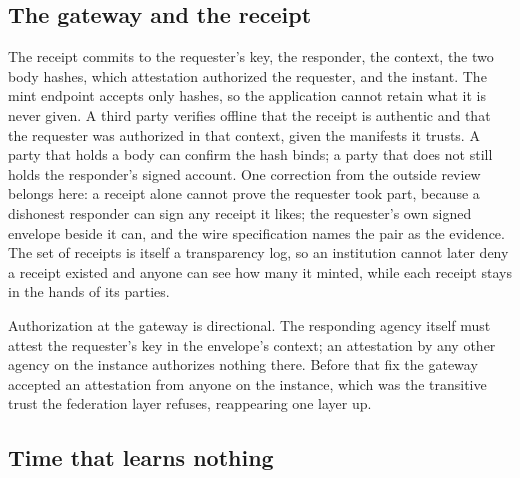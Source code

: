 \subsection{The gateway and the receipt}

The receipt commits to the requester's key, the responder, the context, the two body hashes, which
attestation authorized the requester, and the instant. The mint endpoint accepts only hashes, so the
application cannot retain what it is never given. A third party verifies offline that the receipt is
authentic and that the requester was authorized in that context, given the manifests it trusts. A
party that holds a body can confirm the hash binds; a party that does not still holds the
responder's signed account. One correction from the outside review belongs here: a receipt alone
cannot prove the requester took part, because a dishonest responder can sign any receipt it likes;
the requester's own signed envelope beside it can, and the wire specification names the pair as the
evidence. The set of receipts is itself a transparency log, so an institution cannot later deny a
receipt existed and anyone can see how many it minted, while each receipt stays in the hands of its
parties. \sImpl


Authorization at the gateway is directional. The responding agency itself must
attest the requester's key in the envelope's context; an attestation by any other agency on the
instance authorizes nothing there. Before that fix the gateway accepted an attestation from anyone
on the instance, which was the transitive trust the federation layer refuses, reappearing one layer
up. \sImpl

\subsection{Time that learns nothing}

